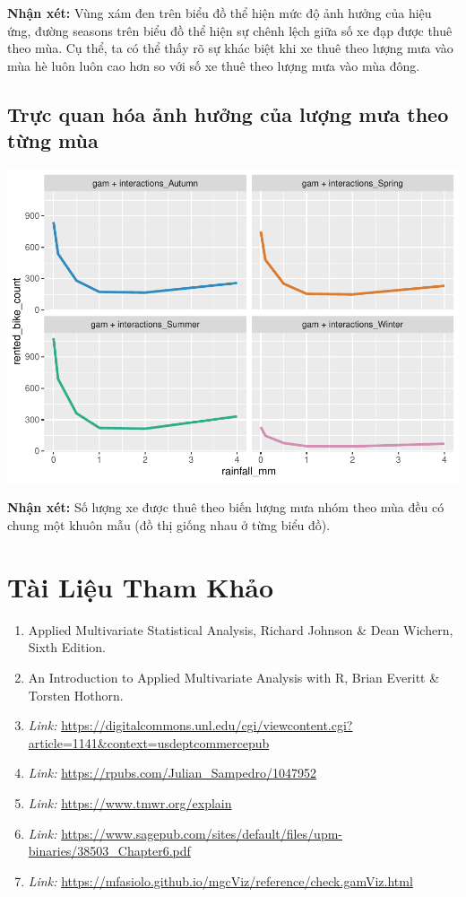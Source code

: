 \documentclass[
  11pt,
  letterpaper,
]{article}
\begin{document}
\textbf{Nhận xét:} Vùng xám đen trên biểu đồ thể hiện mức độ ảnh hưởng của hiệu ứng, đường seasons trên biểu đồ thể hiện sự chênh lệch giữa số xe đạp được thuê theo mùa. Cụ thể, ta có thể thấy rõ sự khác biệt khi xe thuê theo lượng mưa vào mùa hè luôn luôn cao hơn so với số xe thuê theo lượng mưa vào mùa đông.

\subsection{Trực quan hóa ảnh hưởng của lượng mưa theo từng mùa}

\begin{center}\includegraphics[width=1.2\linewidth,]{Final_Project_files/figure-latex/unnamed-chunk-52-1} \end{center}

\textbf{Nhận xét:} Số lượng xe được thuê theo biến lượng mưa nhóm theo mùa đều có chung một khuôn mẫu (đồ thị giống nhau ở từng biểu đồ).

\section{Tài Liệu Tham Khảo}

\begin{enumerate}
    \item Applied Multivariate Statistical Analysis, Richard Johnson \& Dean Wichern, Sixth Edition.
    \item An Introduction to Applied Multivariate Analysis with R, Brian Everitt \& Torsten Hothorn.
    \item \textit{Link:} \url{https://digitalcommons.unl.edu/cgi/viewcontent.cgi?article=1141&context=usdeptcommercepub}
    \item \textit{Link:} \url{https://rpubs.com/Julian_Sampedro/1047952}
    \item \textit{Link:} \url{https://www.tmwr.org/explain}
    \item \textit{Link:} \url{https://www.sagepub.com/sites/default/files/upm-binaries/38503_Chapter6.pdf}
    \item \textit{Link:} \url{https://mfasiolo.github.io/mgcViz/reference/check.gamViz.html}
\end{enumerate}
\end{document}

